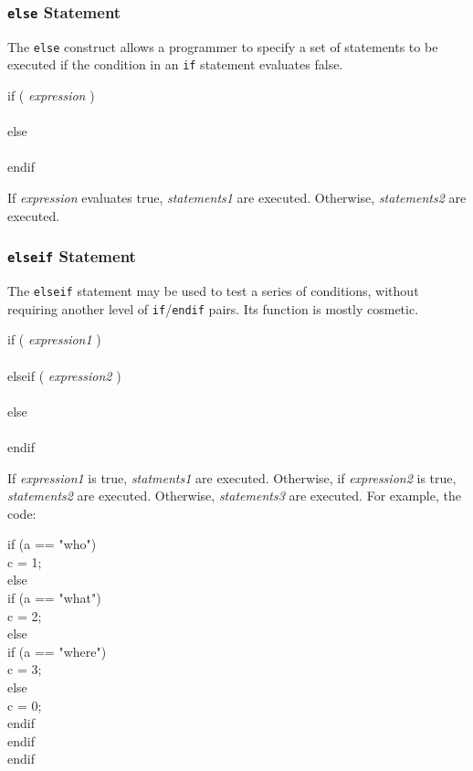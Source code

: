 \subsubsection{{\tt else} Statement}

The {\tt else} construct allows a programmer to specify a set of statements
to be executed if the condition in an {\tt if} statement evaluates false.

\begin{code}
if ( {\em expression } ) \\
 \\
else \\
 \\
endif
\end{code}

If {\em expression } evaluates true, {\em statements1 } are executed.
Otherwise, {\em statements2 } are executed.

\subsubsection{{\tt elseif} Statement}

The {\tt elseif} statement may be used to test a series of
conditions, without requiring another level of {\tt if}/{\tt endif}
pairs.  Its function is mostly cosmetic.

\begin{code}
if ( {\em expression1 } ) \\
 \\
elseif ( {\em expression2 } ) \\
 \\
else \\
 \\
endif
\end{code}

If {\em expression1 } is true, {\em statments1 } are executed.  Otherwise,
if {\em expression2 } is true, {\em statements2 } are executed.  Otherwise,
{\em statements3 } are executed.  For example, the code:

\begin{code}
if (a == "who") \\
\ind c = 1; \\
else \\
\ind if (a == "what") \\
\ind \ind c = 2; \\
\ind else \\
\ind \ind if (a == "where") \\
\ind \ind \ind c = 3; \\
\ind \ind else \\
\ind \ind \ind c = 0; \\
\ind \ind endif \\
\ind endif \\
endif
\end{code}

